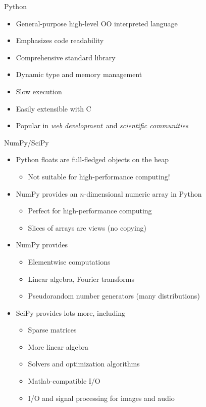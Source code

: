 \documentclass[utf8x,xcolor=pdftex,dvipsnames,table]{beamer}
\begin{document}
\begin{frame}{Python}
  \begin{itemize}
  \item General-purpose high-level OO interpreted language
  \item Emphasizes code readability
  \item Comprehensive standard library
  \item Dynamic type and memory management
  \item Slow execution
  \item Easily extensible with C
  \item Popular in {\em web development}\ and {\em scientific communities}
  \end{itemize}
\end{frame}

\begin{frame}{NumPy/SciPy}
  \begin{itemize}
  \item Python floats are full-fledged objects on the heap
      \begin{itemize}
      \item Not suitable for high-performance computing!
      \end{itemize}

  \item NumPy provides an $n$-dimensional numeric array in Python
      \begin{itemize}
      \item Perfect for high-performance computing
      \item Slices of arrays are views (no copying)
      \end{itemize}

  \item NumPy provides
      \begin{itemize}
      \item Elementwise computations
      \item Linear algebra, Fourier transforms
      \item Pseudorandom number generators (many distributions)
      \end{itemize}

  \item SciPy provides lots more, including
      \begin{itemize}
      \item Sparse matrices
      \item More linear algebra
      \item Solvers and optimization algorithms
      \item Matlab-compatible I/O
      \item I/O and signal processing for images and audio
      \end{itemize}
  \end{itemize}
\end{frame}
\end{document}
